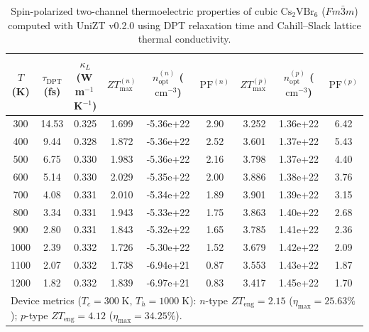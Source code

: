 \begin{table}[htbp]
\centering
\caption{Spin-polarized two-channel thermoelectric properties of cubic $\mathrm{Cs_2VBr_6}$ ($Fm\bar{3}m$) computed with UniZT v0.2.0 using DPT relaxation time and Cahill--Slack lattice thermal conductivity.}
\label{tab:cs2vbr6_summary}
\begin{tabular}{ccccccccc}
\toprule
$T$ (K) & $\tau_{\mathrm{DPT}}$ (fs) & $\kappa_L$ (W\,m$^{-1}$\,K$^{-1}$) & $ZT_{\max}^{(n)}$ & $n_{\mathrm{opt}}^{(n)}$ ($\mathrm{cm}^{-3}$) & $\mathrm{PF}^{(n)}$ & $ZT_{\max}^{(p)}$ & $n_{\mathrm{opt}}^{(p)}$ ($\mathrm{cm}^{-3}$) & $\mathrm{PF}^{(p)}$ \\
\midrule
300 & 14.53 & 0.325 & 1.699 & -5.36e+22 & 2.90 & 3.252 & 1.36e+22 & 6.42 \\
400 & 9.44 & 0.328 & 1.872 & -5.36e+22 & 2.52 & 3.601 & 1.37e+22 & 5.43 \\
500 & 6.75 & 0.330 & 1.983 & -5.36e+22 & 2.16 & 3.798 & 1.37e+22 & 4.40 \\
600 & 5.14 & 0.330 & 2.029 & -5.35e+22 & 2.00 & 3.886 & 1.38e+22 & 3.76 \\
700 & 4.08 & 0.331 & 2.010 & -5.34e+22 & 1.89 & 3.901 & 1.39e+22 & 3.15 \\
800 & 3.34 & 0.331 & 1.943 & -5.33e+22 & 1.75 & 3.863 & 1.40e+22 & 2.68 \\
900 & 2.80 & 0.331 & 1.843 & -5.32e+22 & 1.65 & 3.785 & 1.41e+22 & 2.36 \\
1000 & 2.39 & 0.332 & 1.726 & -5.30e+22 & 1.52 & 3.679 & 1.42e+22 & 2.09 \\
1100 & 2.07 & 0.332 & 1.738 & -6.94e+21 & 0.87 & 3.553 & 1.43e+22 & 1.87 \\
1200 & 1.82 & 0.332 & 1.839 & -6.97e+21 & 0.83 & 3.417 & 1.45e+22 & 1.70 \\
\midrule
\multicolumn{9}{l}{Device metrics ($T_c=300\;\mathrm{K},\,T_h=1000\;\mathrm{K}$): $n$-type $ZT_{\mathrm{eng}}=2.15$ ($\eta_{\max}=25.63\%$); $p$-type $ZT_{\mathrm{eng}}=4.12$ ($\eta_{\max}=34.25\%$).} \\
\bottomrule
\end{tabular}
\end{table}
